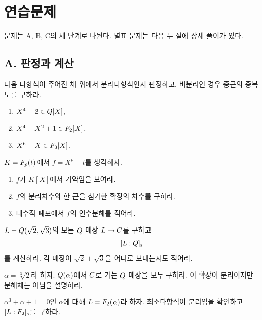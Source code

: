 \section{연습문제}
\label{sec:separability-exercises}

문제는 A, B, C의 세 단계로 나뉜다. 별표 문제는 다음 두 절에 상세 풀이가 있다.

\subsection*{A. 판정과 계산}

\begin{exercise}[*]
다음 다항식이 주어진 체 위에서 분리다항식인지 판정하고, 비분리인 경우 중근의 중복도를 구하라.
\begin{enumerate}[label=(\alph*)]
  \item $X^4-2\in Q[X]$,
  \item $X^4+X^2+1\in F_2[X]$,
  \item $X^6-X\in F_3[X]$.
\end{enumerate}
\end{exercise}

\begin{exercise}[*]
$K=F_p(t)$에서 $f=X^p-t$를 생각하자.
\begin{enumerate}[label=(\alph*)]
  \item $f$가 $K[X]$에서 기약임을 보여라.
  \item $f$의 분리차수와 한 근을 첨가한 확장의 차수를 구하라.
  \item 대수적 폐포에서 $f$의 인수분해를 적어라.
\end{enumerate}
\end{exercise}

\begin{exercise}[*]
$L=Q(\sqrt2,\sqrt3)$의 모든 $Q$-매장 $L\to C$를 구하고
\[
  [L:Q]_{\mathrm s}
\]
를 계산하라. 각 매장이 $\sqrt2+\sqrt3$을 어디로 보내는지도 적어라.
\end{exercise}

\begin{exercise}
$\alpha=\sqrt[3]{2}$라 하자. $Q(\alpha)$에서 $C$로 가는 $Q$-매장을 모두 구하라. 이 확장이 분리이지만 분해체는 아님을 설명하라.
\end{exercise}

\begin{exercise}
$\alpha^3+\alpha+1=0$인 $\alpha$에 대해 $L=F_2(\alpha)$라 하자. 최소다항식이 분리임을 확인하고 $[L:F_2]_{\mathrm s}$를 구하라.
\end{exercise}

